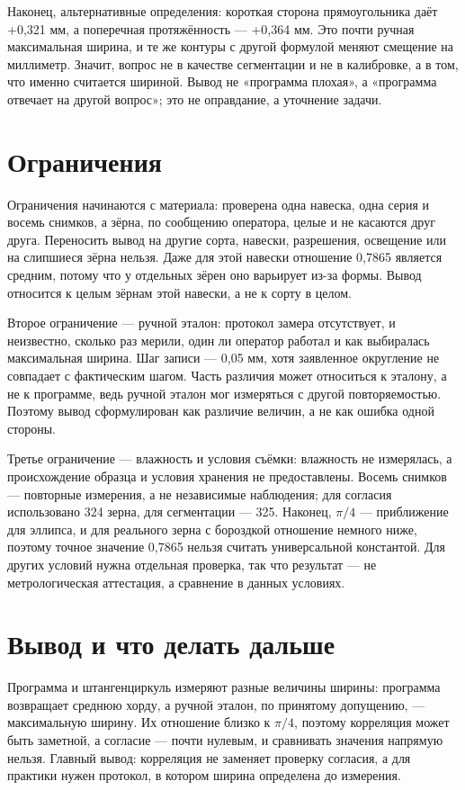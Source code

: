 \documentclass[12pt,a4paper]{article}
\begin{document}
Наконец, альтернативные определения: короткая сторона прямоугольника даёт
+0,321 мм, а поперечная протяжённость --- +0,364 мм. Это почти ручная
максимальная ширина, и те же контуры с другой формулой меняют смещение на
миллиметр. Значит, вопрос не в качестве сегментации и не в калибровке, а в
том, что именно считается шириной. Вывод не «программа плохая», а
«программа отвечает на другой вопрос»; это не оправдание, а уточнение
задачи.

\section{Ограничения}

Ограничения начинаются с материала: проверена одна навеска, одна серия и
восемь снимков, а зёрна, по сообщению оператора, целые и не касаются друг
друга. Переносить вывод на другие сорта, навески, разрешения, освещение или на слипшиеся зёрна нельзя.
Даже для этой навески отношение 0,7865 является средним, потому что у
отдельных зёрен оно варьирует из-за формы. Вывод относится к целым зёрнам
этой навески, а не к сорту в целом.

Второе ограничение --- ручной эталон: протокол замера отсутствует, и
неизвестно, сколько раз мерили, один ли оператор работал и как выбиралась
максимальная ширина. Шаг записи --- 0,05 мм, хотя заявленное округление не
совпадает с фактическим шагом. Часть различия может относиться к эталону, а
не к программе, ведь ручной эталон мог измеряться с другой повторяемостью.
Поэтому вывод сформулирован как различие величин, а не как ошибка одной
стороны.

Третье ограничение --- влажность и условия съёмки: влажность не
измерялась, а происхождение образца и условия хранения не предоставлены.
Восемь снимков --- повторные измерения, а не независимые наблюдения; для
согласия использовано 324 зерна, для сегментации --- 325. Наконец, $\pi/4$ ---
приближение для эллипса, и для реального зерна с бороздкой отношение немного
ниже, поэтому точное значение 0,7865 нельзя считать универсальной
константой. Для других условий нужна отдельная проверка, так что результат
--- не метрологическая аттестация, а сравнение в данных условиях.

\section{Вывод и что делать дальше}

Программа и штангенциркуль измеряют разные величины ширины: программа
возвращает среднюю хорду, а ручной эталон, по принятому допущению, ---
максимальную ширину. Их отношение близко к $\pi/4$, поэтому корреляция
может быть заметной, а согласие --- почти нулевым, и сравнивать значения
напрямую нельзя. Главный вывод: корреляция не заменяет проверку согласия, а
для практики нужен протокол, в котором ширина определена до измерения.
\end{document}
